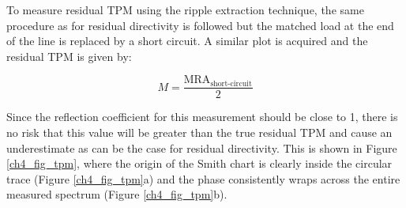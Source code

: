 \documentclass[../thesis/thesis.tex]{subfiles}
\begin{document}
\begin{refsection}
To measure residual TPM using the ripple extraction technique, the same procedure as for residual directivity is followed but the matched load at the end of the line is replaced by a short circuit. A similar plot is acquired and the residual TPM is given by:

\begin{equation}
M = \frac{\textrm{MRA}_\textrm{short-circuit}}{2}
\end{equation}

Since the reflection coefficient for this measurement should be close to 1, there is no risk that this value will be greater than the true residual TPM and cause an underestimate as can be the case for residual directivity. This is shown in Figure \ref{ch4_fig_tpm}, where the origin of the Smith chart is clearly inside the circular trace (Figure \ref{ch4_fig_tpm}a) and the phase consistently wraps across the entire measured spectrum (Figure \ref{ch4_fig_tpm}b).


\end{refsection}
\end{document}
